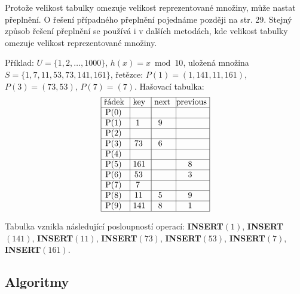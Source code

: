 \documentclass[a4paper,12pt]{article}
\begin{document}
Pro\-to\-že ve\-li\-kost ta\-bul\-ky o\-me\-zu\-je ve\-li\-kost re\-pre\-zen\-to\-va\-né mno\-ži\-ny, mů\-že na\-stat pře\-pl\-ně\-ní. O řešení 
případného přeplnění pojednáme později na str. 29. Stejný způsob řešení přeplnění se používá i v dalších metodách, kde velikost tabulky omezuje velikost reprezentované množiny.

Příklad: $U=\{1,2,\dots,1000\}$, $h(x)=x\bmod10$,\newline 
uložená množina $S=\{1,7,11,53,73,141,161\}$,\newline 
řetězce: $P(1)=(1,141,11,161)$, 
$P(3)=(73,53)$, $P(7)=(7)$.\newline 
Hašovací tabulka:
$$\vtop{\offinterlineskip\halign {\strut\vrule\ # & \vrule\ # & \vrule\ # & \vrule \hfil # \hfil \vrule\cr\noalign{\hrule}řádek & key & next & previous\hfil \cr\noalign{\hrule}P(0) & & & \hfill \cr\noalign{\hrule}P(1) & 1 & 9 & \hfill \cr\noalign{\hrule}P(2) & & & \hfill \cr\noalign{\hrule}P(3) & 73 & 6 & \hfill \cr\noalign{\hrule}P(4) & & &\hfill \cr\noalign{\hrule}P(5) & 161 & & 8 \cr\noalign{\hrule}P(6) & 53 & & 3 \cr\noalign{\hrule}P(7) & 7 & &\hfill \cr\noalign{\hrule}P(8) & 11 & 5 & 9 \cr\noalign{\hrule}P(9) & 141 & 8 & 1 \cr\noalign{\hrule}}}$$

Tabulka vznikla následující posloupností 
operací:\newline 
{\bf INSERT$(1)$}, {\bf INSERT$(141)$}, {\bf INSERT$(11)$}, {\bf INSERT$
(73)$}, 
{\bf INSERT$(53)$},\newline 
{\bf INSERT$(7)$}, {\bf INSERT$(161)$}. 

\subsection{
Algoritmy
}
\end{document}

